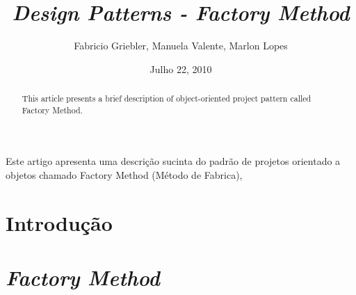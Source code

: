 \documentclass[]{article}
\begin{document}
\date{Julho 22, 2010}   

\sloppy

\title{\emph{Design Patterns - Factory Method}}
\author{Fabricio Griebler, Manuela Valente, Marlon Lopes}

\address{
	 Especialização em Tecnologias Aplicadas a Sistemas de Informação com Métodos Ágeis - 4ª Edição \\
         Uniritter \\
         Porto Alegre, RS \\
}

\maketitle

\pagestyle{plain}


\begin{resumo}

Este artigo apresenta uma descrição sucinta do padrão de projetos orientado a objetos chamado Factory Method (Método de Fabrica), 

\end{resumo}


\begin{abstract}

This article presents a brief description of object-oriented project pattern called Factory Method.

\end{abstract}

\setcounter{page}{1}

\section{Introdução}
\label{sec:introducao}


\section{\emph{Factory Method}}
\label{sec:factory1}





\renewcommand{\bibname}{Referência Bibliografia}

\end{document}
